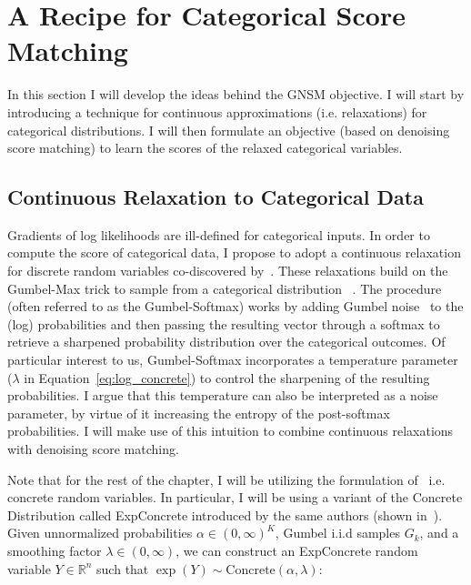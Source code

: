 \section{A Recipe for Categorical Score Matching}

In this section I will develop the ideas behind the GNSM objective. I will start by introducing a technique for continuous approximations (i.e. relaxations) for categorical distributions. I will then formulate an objective (based on denoising score matching) to learn the scores of the relaxed categorical variables. 

\subsection*{Continuous Relaxation to Categorical Data}

Gradients of log likelihoods are ill-defined for categorical inputs. In order to compute the score of categorical data, I propose to adopt a continuous relaxation for discrete random variables co-discovered by~\cite{jang2017categorical, maddison2017concrete}. These relaxations build on the Gumbel-Max trick to sample from a categorical distribution ~\cite{maddison2014sampling}. The procedure (often referred to as the Gumbel-Softmax) works by adding Gumbel noise~\cite{gumbel1954statistical} to the (log) probabilities and then passing the resulting vector through a softmax to retrieve a sharpened probability distribution over the categorical outcomes. Of particular interest to us, Gumbel-Softmax incorporates a temperature parameter ($\lambda$ in Equation~\eqref{eq:log_concrete}) to control the sharpening of the resulting probabilities. I argue that this temperature can also be interpreted as a noise parameter, by virtue of it increasing the entropy of the post-softmax probabilities. I will make use of this intuition to combine continuous relaxations with denoising score matching. 

Note that for the rest of the chapter, I will be utilizing the formulation of~\cite{maddison2017concrete} i.e. concrete random variables. In particular, I will be using a variant of the Concrete Distribution called ExpConcrete introduced by the same authors (shown in~). Given unnormalized probabilities $\alpha \in (0, \infty)^K$, Gumbel i.i.d samples $\mathit{G}_k$, and a smoothing factor $\lambda \in (0, \infty)$, we can construct an ExpConcrete random variable $Y \in \mathbb{R}^n$ such that $\exp(Y) \sim \text{Concrete}(\alpha, \lambda) $:

